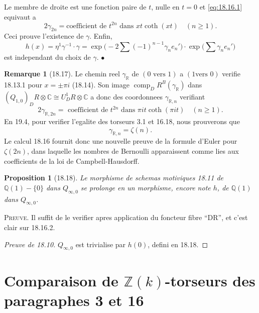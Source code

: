 \documentclass[12pt,a4paper]{article}
\theoremstyle{plain}
\newtheorem{proposition}[theorem]{Proposition}
\theoremstyle{definition}
\newtheorem{remark}[theorem]{Remarque}
\theoremstyle{remark}
\DeclareMathOperator{\comp}{comp}
\newcommand{\Betti}{B}
\newcommand{\dR}{DR}
\newcommand{\ZZ}{\mathbb{Z}}
\newcommand{\QQ}{\mathbb{Q}}
\newcommand{\CC}{\mathbb{C}}
\newcommand{\RR}{\mathbb{R}}
\begin{document}
Le membre de droite est une fonction paire de $t$, nulle en $t = 0$
et \eqref{eq:18.16.1} equivaut a
\begin{equation}\label{eq:18.16.2}
2\gamma_{2n} = \text{coefficient de } t^{2n} \text{ dans } xt
\coth(xt) \quad (n \geq 1).
\end{equation}
Ceci prouve l'existence de $\gamma$. Enfin,
\[
h(x) = \eta^1 \gamma^{-1} \cdot \gamma =
\exp\bigl(-2\sum (-1)^{n-1} \gamma_n e_n'\bigr) \cdot
\exp\bigl(\sum \gamma_n e_n'\bigr)
\]
est independant du choix de $\gamma$. \hfill $\bullet$

\begin{remark}[18.17]\label{rem:18.17}
Le chemin reel $\gamma_\RR$ de $(0 \text{ vers } 1)$ a $(1 \text{
vers } 0)$ verifie 18.13.1 pour $x = \pm \pi i$ (18.14). Son image
$\comp_\dR^\Betti(\gamma_\RR)$ dans $(Q_{1,0})_\dR \otimes \CC
\cong U^1_\dR \otimes \CC$ a donc des coordonnees
$\gamma_{\RR,n}$ verifiant
\begin{equation}\label{eq:18.17.1}
2\gamma_{\RR,2n} = \text{ coefficient de } t^{2n} \text{ dans }
\pi i t \coth(\pi i t) \quad (n \geq 1).
\end{equation}
En 19.4, pour verifier l'egalite des torseurs 3.1 et 16.18, nous
prouverons que
\[
\gamma_{\RR,n} = \zeta(n).
\]
Le calcul 18.16 fournit donc une nouvelle preuve de la formule
d'Euler pour $\zeta(2n)$, dans laquelle les nombres de Bernoulli
apparaissent comme lies aux coefficients de la loi de
Campbell-Hausdorff.
\end{remark}

\begin{proposition}[18.18]\label{prop:18.18}
Le morphisme de schemas motiviques 18.11 de $\QQ(1) - \{0\}$ dans
$Q_{\infty,0}$ se prolonge en un morphisme, encore note $h$, de
$\QQ(1)$ dans $Q_{\infty,0}$.
\end{proposition}

\noindent \textsc{Preuve.} Il suffit de le verifier apres application
du foncteur fibre ``DR'', et c'est clair sur 18.16.2.

\begin{proof}[Preuve de 18.10]
$Q_{\infty,0}$ est trivialise par $h(0)$, defini en 18.18.
\end{proof}


\section{Comparaison de $\ZZ(k)$-torseurs des paragraphes 3 et 16}\label{sec:19}
\end{document}
